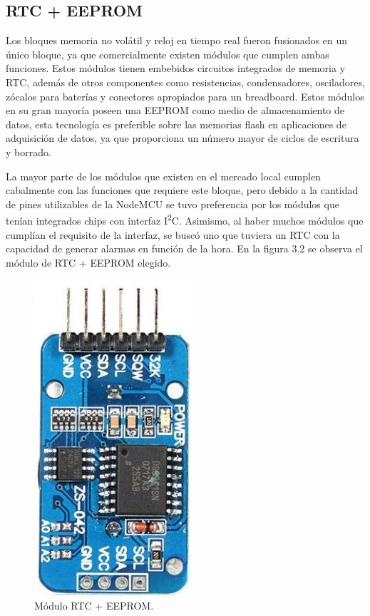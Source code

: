 \subsection{RTC + EEPROM}

Los bloques memoria no volátil y reloj en tiempo real fueron fusionados en un único bloque, ya que comercialmente existen módulos que cumplen ambas funciones. Estos módulos tienen embebidos circuitos integrados de memoria y RTC, además de otros componentes como resistencias, condensadores, osciladores, zócalos para baterías y conectores apropiados para un breadboard. Estos módulos en su gran mayoría poseen una EEPROM como medio de almacenamiento de datos, esta tecnología es preferible sobre las memorias flash en aplicaciones de adquisición de datos, ya que proporciona un número mayor de ciclos de escritura y borrado.

La mayor parte de los módulos que existen en el mercado local cumplen cabalmente con las funciones que requiere este bloque, pero debido a la cantidad de pines utilizables de la NodeMCU se tuvo preferencia por los módulos que tenían integrados chips con interfaz I\textsuperscript{2}C. Asimismo, al haber muchos módulos que cumplían el requisito de la interfaz, se buscó uno que tuviera un RTC con la capacidad de generar alarmas en función de la hora. En la figura 3.2 se observa el módulo de RTC + EEPROM elegido.

\begin{figure}[h]
	\centering
	\includegraphics[scale=0.35]{./Figures/rtc_eeprom.jpg}
	\caption{Módulo RTC + EEPROM\protect\footnotemark.}
		\label{fig:cuadradoAzul}
	\end{figure}

